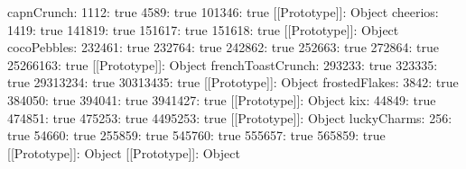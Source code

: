 capnCrunch:
1112: true
4589: true
101346: true
[[Prototype]]: Object
cheerios:
1419: true
141819: true
151617: true
151618: true
[[Prototype]]: Object
cocoPebbles:
232461: true
232764: true
242862: true
252663: true
272864: true
25266163: true
[[Prototype]]: Object
frenchToastCrunch:
293233: true
323335: true
29313234: true
30313435: true
[[Prototype]]: Object
frostedFlakes:
3842: true
384050: true
394041: true
3941427: true
[[Prototype]]: Object
kix:
44849: true
474851: true
475253: true
4495253: true
[[Prototype]]: Object
luckyCharms:
256: true
54660: true
255859: true
545760: true
555657: true
565859: true
[[Prototype]]: Object
[[Prototype]]: Object